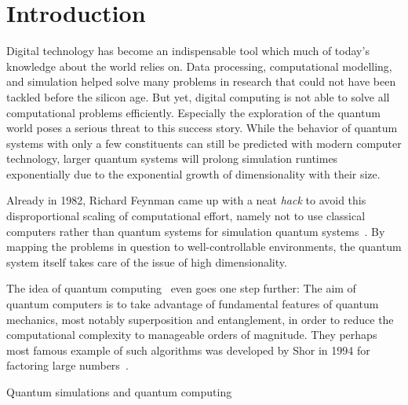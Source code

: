 \renewcommand{\imagepath}{../10-intro/img}

\chapter{Introduction}
Digital technology has become an indispensable tool which much of today's knowledge about the world relies on. Data processing, computational modelling, and simulation helped solve many problems in research that could not have been tackled before the silicon age. But yet, digital computing is not able to solve all computational problems efficiently. Especially the exploration of the quantum world poses a serious threat to this success story. While the behavior of quantum systems with only a few constituents can still be predicted with modern computer technology, larger quantum systems will prolong simulation runtimes exponentially due to the exponential growth of dimensionality with their size.

Already in 1982, Richard Feynman came up with a neat \textit{hack} to avoid this disproportional scaling of computational effort, namely not to use classical computers rather than quantum systems for simulation quantum systems~\cite{feynman_simulating_1982}. By mapping the problems in question to well-controllable environments, the quantum system itself takes care of the issue of high dimensionality.

The idea of quantum computing~\cite{hidary_quantum_2021, mainzer_quantencomputer_2020} even goes one step further: The aim of quantum computers is to take advantage of fundamental features of quantum mechanics, most notably superposition and entanglement, in order to reduce the computational complexity to manageable orders of magnitude. They perhaps most famous example of such algorithms was developed by Shor in 1994 for factoring large numbers~\cite{shor_algorithms_1994}.

Quantum simulations and quantum computing 



